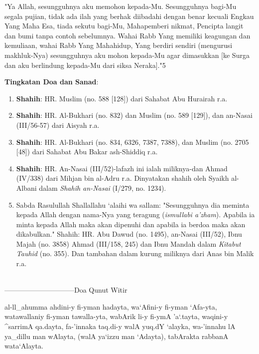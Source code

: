 \documentclass[a4paper,12pt]{article}
\begin{document}
\par
\indent
"Ya Allah, sesungguhnya aku memohon kepada-Mu. Sesungguhnya bagi-Mu segala 
pujian, tidak ada ilah yang berhak diibadahi dengan benar kecuali Engkau 
Yang Maha Esa, tiada sekutu bagi-Mu, Mahapemberi nikmat, Pencipta langit 
dan bumi tanpa contoh sebelumnya. Wahai Rabb Yang memiliki keagungan dan 
kemuliaan, wahai Rabb Yang Mahahidup, Yang berdiri sendiri (mengurusi 
makhluk-Nya) sesungguhnya aku mohon kepada-Mu agar dimasukkan [ke Surga dan
aku berlindung kepada-Mu dari siksa Neraka]."{\scriptsize 5}\\
\par
\noindent
\textbf{Tingkatan Doa dan Sanad}:
\begin{enumerate}
\item \textbf{Shahih}: HR. Muslim (no. 588 [128]) dari Sahabat Abu Hurairah 
r.a.
\item \textbf{Shahih}: HR. Al-Bukhari (no. 832) dan Muslim (no. 589 [129]), 
dan an-Nasai (III/56-57) dari Aisyah r.a.
\item \textbf{Shahih}: HR. Al-Bukhari (no. 834, 6326, 7387, 7388), dan 
Muslim (no. 2705 [48]) dari Sahabat Abu Bakar ash-Shiddiq r.a.
\item \textbf{Shahih}: HR. An-Nasai (III/52)-lafazh ini ialah miliknya-dan 
Ahmad (IV/338) dari Mihjan bin al-Adru r.a. Dinyatakan shahih oleh Syaikh 
al-Albani dalam \textit{Shah\^{i}h an-Nasai} (I/279, no. 1234).
\item Sabda Rasulullah Shallallahu ‘alaihi wa sallam: "Sesungguhnya dia 
meminta kepada Allah dengan nama-Nya yang teragung (\textit{ismullabi 
a'zham}). Apabila ia minta kepada Allah maka akan dipenuhi dan apabila ia 
berdoa maka akan dikabulkan." Shahih: HR. Abu Dawud (no. 1495), an-Nasai 
(III/52), Ibnu Majah (no. 3858) Ahmad (III/158, 245) dan Ibnu Mandah dalam 
\textit{Kitabut Tauhid} (no. 355). Dan tambahan dalam kurung miliknya dari 
Anas bin Malik r.a.\\\\
\end{enumerate}
\par
{}------------------------------Doa Qunut Witir
\begin{arabtext}
\noindent
al-ll_ahumma ahdini-y fi-yman hadayta, wa`Afini-y fi-yman `Afa-yta, 
watawallaniy fi-yman tawalla-yta, wabArik li-y fi-ymA 'a`.tayta, waqini-y 
^sarrimA qa.dayta, fa-'innaka taq.di-y walA yuq.dY `alayka, wa-'innahu lA 
ya_dillu man wAlayta, (walA ya`izzu man `Adayta), tabArakta rabbanA 
wata`Alayta.\\
\end{arabtext}
\end{document}

